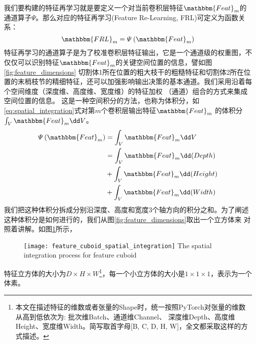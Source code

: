 我们要构建的特征再学习就是要定义一个对当前卷积层特征$\mathbbm{Feat}_m$的通道算子$\varPsi$。那么对应的特征再学习(Feature Re-Learning, FRL)可定义为函数关系：
\begin{equation}
    \mathbbm{FRL}_m = \varPsi\left(\mathbbm{Feat}_m\right)
\end{equation}
特征再学习的通道算子是为了校准卷积层特征输出，它是一个通道级的权重图，不仅仅可以识别特征$\mathbbm{Feat}_m$的关键空间位置的信息，譬如图\ref{fig:feature_dimensions}
切割体1所在位置的粗大枝干的粗糙特征和切割体2所在位置的末梢枝节的精细特征，还可以加强影响输出决策的基本通道。我们采用沿着每个空间维度（深度维、高度维、宽度维）的特征加权
（通道）组合的方式来集成空间位置的信息。 这是一种空间积分的方法，也称为体积分，如\ref{eq:spatial_integration}式对第$m$个卷积层输出特征$\mathbbm{Feat}_m$
的体积分$\int_{V}\mathbbm{Feat}_m\dd V$。
\begin{equation}\label{eq:spatial_integration}
\begin{split}
    \varPsi\left(\mathbbm{Feat}_m\right) &= \int_{V}\mathbbm{Feat}_m\dd V \\
                                         &= \int_{V}\mathbbm{Feat}_m\dd (Depth) \\
                                         &+ \int_{V}\mathbbm{Feat}_m\dd (Height) \\
                                         &+ \int_{V}\mathbbm{Feat}_m\dd (Width)
\end{split}
\end{equation}
我们把这种体积分拆成分别沿深度、高度和宽度3个轴方向的积分之和。为了阐述这种体积分是如何进行的，我们从图\ref{fig:feature_dimensions}取出一个立方体来
对照着讲解。如图\ref{fig:spatial_integration}所示，
\begin{figure}[!htp]
    \centering
    \texttt{[image: feature\_cuboid\_spatial\_integration]}
        {The spatial integration process for feature cuboid}
    \label{fig:spatial_integration}
\end{figure}
特征立方体的大小为$D \times H \times W$\footnote{本文在描述特征的维数或者张量的Shape时，统一按照PyTorch对张量的维数从高到低依次为: 批次维Batch、通道维Channel、
深度维Depth、高度维Height、宽度维Width。简写取首字母[B, C, D, H, W]，全文都采取这样的方式描述。}，每一个小立方体的大小是$1 \times 1 \times 1$，表示为一个体素。

